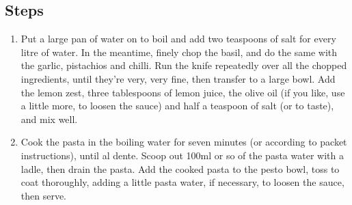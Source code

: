 \documentclass{book}
\begin{document}
\subsection*{Steps}
\begin{enumerate}
\item Put a large pan of water on to boil and add two teaspoons of salt for every litre of water. In the meantime, finely chop the basil, and do the same with the garlic, pistachios and chilli. Run the knife repeatedly over all the chopped ingredients, until they’re very, very fine, then transfer to a large bowl. Add the lemon zest, three tablespoons of lemon juice, the olive oil (if you like, use a little more, to loosen the sauce) and half a teaspoon of salt (or to taste), and mix well.
\item Cook the pasta in the boiling water for seven minutes (or according to packet instructions), until al dente. Scoop out 100ml or so of the pasta water with a ladle, then drain the pasta. Add the cooked pasta to the pesto bowl, toss to coat thoroughly, adding a little pasta water, if necessary, to loosen the sauce, then serve.
\end{enumerate}
\newpage
\end{document}
